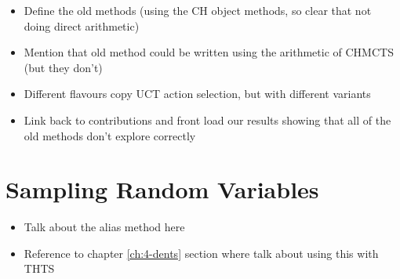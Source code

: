     \begin{itemize}
        \item Define the old methods (using the CH object methods, so clear that not doing direct arithmetic)
        \item Mention that old method could be written using the arithmetic of CHMCTS (but they don't) 
        \item Different flavours copy UCT action selection, but with different variants
        \item Link back to contributions and front load our results showing that all of the old methods don't explore correctly
    \end{itemize}







\section{Sampling Random Variables}
\label{sec:2-5-sampling}

    \begin{itemize}
        \item Talk about the alias method here
        \item Reference to chapter \ref{ch:4-dents} section where talk about using this with THTS
    \end{itemize}